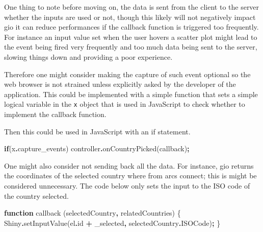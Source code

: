 \documentclass[
]{krantz}
\makeatletter
\newenvironment{Shaded}{\begin{snugshade}}{\end{snugshade}}
\newcommand{\AttributeTok}[1]{\textcolor[rgb]{0.61,0.61,0.61}{#1}}
\newcommand{\CommentTok}[1]{\textcolor[rgb]{0.37,0.37,0.37}{\textit{#1}}}
\newcommand{\ControlFlowTok}[1]{\textcolor[rgb]{0.27,0.27,0.27}{\textbf{#1}}}
\newcommand{\FunctionTok}[1]{\textcolor[rgb]{0,0,0}{#1}}
\newcommand{\KeywordTok}[1]{\textcolor[rgb]{0.27,0.27,0.27}{\textbf{#1}}}
\newcommand{\NormalTok}[1]{#1}
\newcommand{\OperatorTok}[1]{\textcolor[rgb]{0.43,0.43,0.43}{\textbf{#1}}}
\newcommand{\OtherTok}[1]{\textcolor[rgb]{0.37,0.37,0.37}{#1}}
\newcommand{\StringTok}[1]{\textcolor[rgb]{0.5,0.5,0.5}{#1}}
\newenvironment{kframe}{%
\medskip{}
\setlength{\fboxsep}{.8em}
 \def\at@end@of@kframe{}%
 \ifinner\ifhmode%
  \def\at@end@of@kframe{\end{minipage}}%
  \begin{minipage}{\columnwidth}%
 \fi\fi%
 \def\FrameCommand##1{\hskip\@totalleftmargin \hskip-\fboxsep
 \colorbox{shadecolor}{##1}\hskip-\fboxsep
     \hskip-\linewidth \hskip-\@totalleftmargin \hskip\columnwidth}%
 \MakeFramed {\advance\hsize-\width
   \@totalleftmargin\z@ \linewidth\hsize
   \@setminipage}}%
 {\par\unskip\endMakeFramed%
 \at@end@of@kframe}
\renewenvironment{Shaded}{\begin{kframe}}{\end{kframe}}
\makeatother
\begin{document}
One thing to note before moving on, the data is sent from the client to the server whether the inputs are used or not, though this likely will not negatively impact gio it can reduce performances if the callback function is triggered too frequently. For instance an input value set when the user hovers a scatter plot might lead to the event being fired very frequently and too much data being sent to the server, slowing things down and providing a poor experience.

Therefore one might consider making the capture of such event optional so the web browser is not strained unless explicitly asked by the developer of the application. This could be implemented with a simple function that sets a simple logical variable in the \texttt{x} object that is used in JavaScript to check whether to implement the callback function.

\begin{Shaded}
\end{Shaded}

Then this could be used in JavaScript with an if statement.

\begin{Shaded}
\begin{Highlighting}[]
\ControlFlowTok{if}\NormalTok{(x}\OperatorTok{.}\AttributeTok{capture\_events}\NormalTok{)}
\NormalTok{  controller}\OperatorTok{.}\FunctionTok{onCountryPicked}\NormalTok{(callback)}\OperatorTok{;}
\end{Highlighting}
\end{Shaded}

One might also consider not sending back all the data. For instance, gio returns the coordinates of the selected country where from arcs connect; this is might be considered unnecessary. The code below only sets the input to the ISO code of the country selected.

\begin{Shaded}
\begin{Highlighting}[]
\KeywordTok{function} \FunctionTok{callback}\NormalTok{ (selectedCountry}\OperatorTok{,}\NormalTok{ relatedCountries) \{}
\NormalTok{  Shiny}\OperatorTok{.}\FunctionTok{setInputValue}\NormalTok{(el}\OperatorTok{.}\AttributeTok{id} \OperatorTok{+} \StringTok{\textquotesingle{}\_selected\textquotesingle{}}\OperatorTok{,}\NormalTok{ selectedCountry}\OperatorTok{.}\AttributeTok{ISOCode}\NormalTok{)}\OperatorTok{;}
\NormalTok{\}}
\end{Highlighting}
\end{Shaded}
\end{document}
